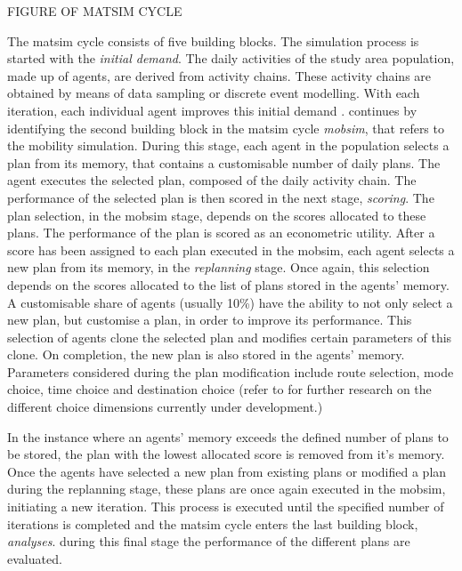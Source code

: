 FIGURE OF MATSIM CYCLE

The \acrshort{matsim} cycle consists of five building blocks. The simulation process is started with the \textit{initial demand}. The daily activities of the study area population, made up of agents, are derived from activity chains. These activity chains are obtained by means of data sampling or discrete event modelling. With each iteration, each individual agent improves this initial demand \citep{horni2016multi}. \citet{horni2016multi} continues by identifying the second building block in the \acrshort{matsim} cycle \textit{mobsim}, that refers to the mobility simulation. During this stage, each agent in the population selects a plan from its memory, that contains a customisable number of daily plans. The agent executes the selected plan, composed of the daily activity chain. The performance of the selected plan is then scored in the next stage, \textit{scoring}. The plan selection, in the mobsim stage, depends on the scores allocated to these plans. The performance of the plan is scored as an econometric utility. After a score has been assigned to each plan executed in the mobsim, each agent selects a new plan from its memory, in the \textit{replanning} stage. Once again, this selection depends on the scores allocated to the list of plans stored in the agents' memory. A customisable share of agents (usually 10\%) have the ability to not only select a new plan, but customise a plan, in order to improve its performance.  This selection of agents clone the selected plan and modifies certain parameters of this clone. On completion, the new plan is also stored in the agents' memory. Parameters considered during the plan modification include route selection, mode choice, time choice and destination choice (refer to \citet{horni2016multi} for further research on the different choice dimensions currently under development.)\par

In the instance where an agents' memory exceeds the defined number of plans to be stored, the plan with the lowest allocated score is removed from it's memory. Once the agents have selected a new plan from existing plans or modified a plan during the replanning stage, these plans are once again executed in the mobsim, initiating a new iteration. This process is executed until the specified number of iterations is completed and the \acrshort{matsim} cycle enters the last building block, \textit{analyses}. during this final stage the performance of the different plans are evaluated.\par

